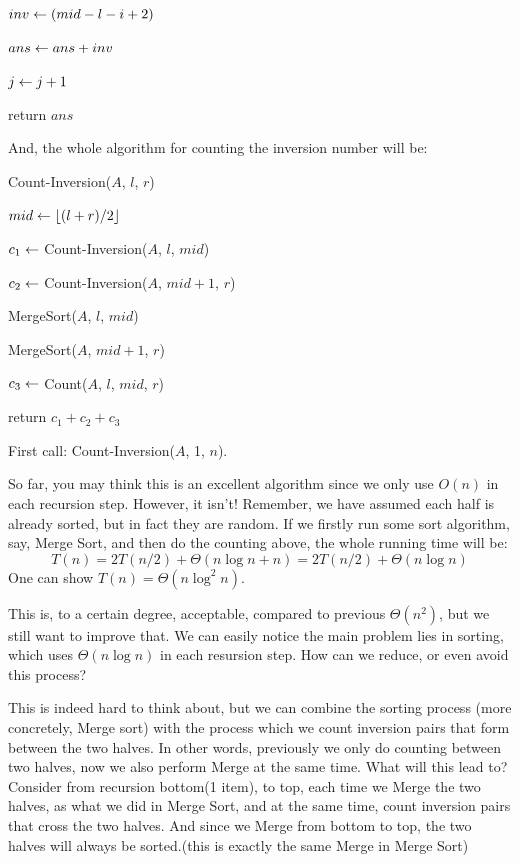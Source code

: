 \documentclass[11pt, a4paper]{COMP3711}
\begin{document}
\begin{spacing}{1.5}
\begin{algorithm}
{{                


                $inv\leftarrow (mid-l-i+2)$

                $ans\leftarrow ans+inv$

                $j\leftarrow j+1$
            }
        }
        return $ans$
    \end{algorithm}

    And, the whole algorithm for counting the inversion number will be:

    \begin{algorithm}
        \caption{Count-Inversion($A$, $l$, $r$)}
        $mid \leftarrow \lfloor (l+r)/2 \rfloor$

        $c_1\leftarrow$ Count-Inversion($A$, $l$, $mid$)

        $c_2\leftarrow$ Count-Inversion($A$, $mid+1$, $r$)

        MergeSort($A$, $l$, $mid$) 

        MergeSort($A$, $mid+1$, $r$) 

        $c_3\leftarrow$ Count($A$, $l$, $mid$, $r$)

        return $c_1+c_2+c_3$
    \end{algorithm}

    First call: Count-Inversion($A$, 1, $n$).

    So far, you may think this is an excellent algorithm since we 
    only use $O(n)$ in each recursion step. However, it isn't! 
    Remember, we have assumed each half is already sorted, but in fact 
    they are random. If we firstly run some sort algorithm, say, 
    Merge Sort, and then do the counting above, the whole 
    running time will be:
    $$T(n)=2T(n/2)+\Theta (n\log n+n)=2T(n/2)+\Theta (n\log n)$$
    One can show $T(n)=\Theta(n\log^2 n)$.

    This is, to a certain degree, acceptable, compared to previous $\Theta(n^2)$,
    but we still want to improve that. 
    We can easily notice the main problem lies in sorting, which 
    uses $\Theta(n\log n)$ in each resursion step. How can we 
    reduce, or even avoid this process? 

    This is indeed hard to think about, but we can combine the sorting process 
    (more concretely, Merge sort)
    with the process which we count inversion pairs that form between the 
    two halves. In other words, previously we only do counting between 
    two halves, now we also perform Merge at the same time.
    What will this lead to? Consider from recursion bottom(1 item), 
    to top, each time we Merge the two halves, as what we did in 
    Merge Sort, and at the same time, count inversion pairs that cross 
    the two halves. And since we Merge from bottom to top, 
    the two halves will always be sorted.(this is exactly the same 
    Merge in Merge Sort)


\end{spacing}
\end{document}
